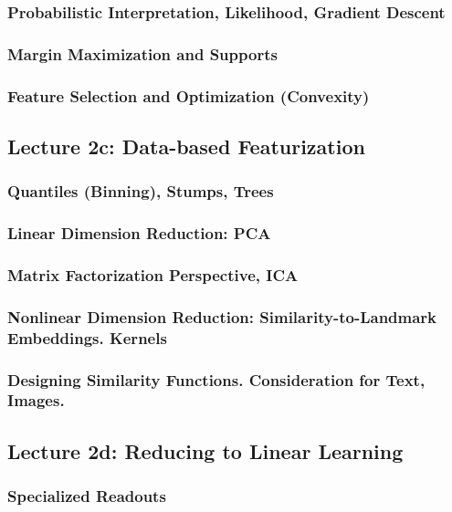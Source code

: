 \documentclass[12pt]{article}
\begin{document}
      \subsubsection*{Probabilistic Interpretation, Likelihood, Gradient Descent}
      \subsubsection*{Margin Maximization and Supports}
      \subsubsection*{Feature Selection and Optimization (Convexity)}
    \newpage

    \subsection*{Lecture 2c: Data-based Featurization} %
      \subsubsection*{Quantiles (Binning), Stumps, Trees}
      \subsubsection*{Linear Dimension Reduction: PCA}
      \subsubsection*{Matrix Factorization Perspective, ICA}
      \subsubsection*{Nonlinear Dimension Reduction: Similarity-to-Landmark Embeddings.  Kernels}
      \subsubsection*{Designing Similarity Functions.  Consideration for Text, Images.}
    \newpage

    \subsection*{Lecture 2d: Reducing to Linear Learning} %
      \subsubsection*{Specialized Readouts}
\end{document}
